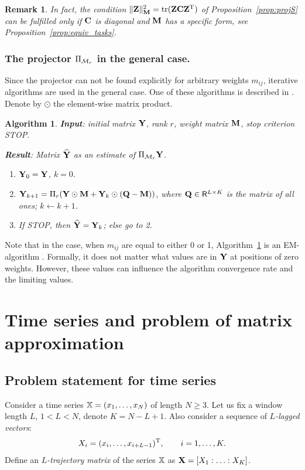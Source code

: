 \documentclass[sii]{ipart}
\DeclareMathOperator{\tr}{tr}
\newtheorem{algorithm}{Algorithm}
\newtheorem{remark}{Remark}
\begin{document}
\begin{remark}
\label{rem:diagC}
	In fact, the condition $\|\bfZ\|_\bfM^2 = \tr(\bfZ \bfC \bfZ^\rmT)$ of Proposition~\ref{prop:projS} can be fulfilled only if $\mathbf{C}$ is diagonal and $\mathbf{M}$ has a specific form, see Proposition~\ref{prop:equiv_tasks}.
\end{remark}

\subsubsection{The projector $\Pi_{\mathcal{M}_r}$ in the general case.}
Since the projector can not be found explicitly for arbitrary weights $m_{ij}$, iterative algorithms are used in the general case.
One of these algorithms is described in \cite{Srebro2003}. Denote by $\odot$ the element-wise matrix product.

\begin{algorithm}
	\label{alg:weightedSVD}
	\textbf{Input}: initial matrix $\mathbf{Y}$, rank $r$, weight matrix $\mathbf{M}$,
	stop criterion STOP.
	
	\textbf{Result}:
	Matrix $\widehat{\mathbf{Y}}$ as an estimate of $\Pi_{\mathcal{M}_r} \mathbf{Y}$.
	
	\begin{enumerate}
		\item
		$\mathbf{Y}_0 = \mathbf{Y}$, $k=0$.
		\item
		$\mathbf{Y}_{k+1} = \Pi_r(\mathbf{Y} \odot \mathbf{M} + \mathbf{Y}_{k} \odot (\mathbf{Q} -  \mathbf{M}))$, where
		$\mathbf{Q} \in \mathsf{R}^{L \times K}$ is the matrix of all ones;
        \quad $k\leftarrow k+1$.
		\item
		If STOP, then $\widehat{\mathbf{Y}} = \mathbf{Y}_k$; else go to 2.
	\end{enumerate}
\end{algorithm}

Note that in the case, when $m_{ij}$ are equal to either 0 or 1, Algorithm~\ref{alg:weightedSVD} is an EM-algorithm \cite{Srebro2003}.
Formally, it does not matter what values are in $\mathbf{Y}$ at positions of zero weights. However, these values can influence the algorithm convergence rate and the limiting values.

\section{Time series and problem of matrix approximation}
\label{sec:ts_matrices}
\subsection{Problem statement for time series}
\label{sec:ts}
Consider a time series $\mathbb{X} = (x_1, \ldots, x_N)$ of length $N \ge 3$. Let us fix a window length $L$, $1 < L < N$, denote $K = N - L + 1$. Also consider a sequence of \emph{$L$-lagged vectors}:
\begin{equation}\label{l_lagged}
X_i = (x_i, \ldots, x_{i + L - 1})^\rmT, \qquad i = 1, \ldots, K.
\end{equation}
Define an \emph{$L$-trajectory matrix} of the series $\mathbb{X}$ as $\mathbf{X} = [X_1:\ldots:X_K]$.
\end{document}
